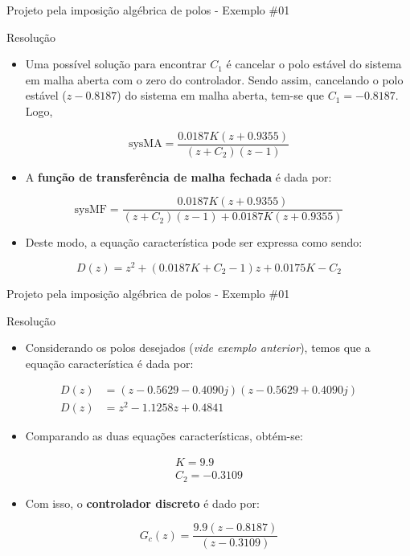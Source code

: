\begin{frame}{Projeto pela imposição algébrica de polos - Exemplo \#01}
	\begin{block}{Resolução}
\begin{itemize}
    \item Uma possível solução para encontrar $C_1$ é cancelar o polo estável do sistema em malha aberta com o zero do controlador. Sendo assim, cancelando o polo estável ($ z-\num{0,8187} $) do sistema em malha aberta, tem-se que $ C_1=-\num{0,8187} $. Logo,
\end{itemize}
	\[ \text{sysMA}=\frac{\num{0,0187}K(z+\num{0,9355})}{(z+C_2)(z-1)} \]
\begin{itemize}
\vspace{-0.2cm}
    \item A \textbf{função de transferência de malha fechada} é dada por:
\end{itemize}		
		\[ \text{sysMF}=\frac{\num{0,0187}K(z+\num{0,9355})}{(z+C_2)(z-1)+\num{0,0187}K(z+\num{0,9355})} \]
\begin{itemize}
\vspace{-0.2cm}
    \item Deste modo, a equação característica pode ser expressa como sendo:
\end{itemize}
\[  D(z)=z^{2}+(\num{0,0187}K+C_2-1)z+\num{0,0175}K-C_2 \]
	\end{block}
\end{frame}

\begin{frame}{Projeto pela imposição algébrica de polos - Exemplo \#01}
	\begin{block}{Resolução}
\begin{itemize}
    \item Considerando os polos desejados (\textit{vide exemplo anterior}), temos que a equação característica é dada por:
\end{itemize}
		\begin{align*}
			D(z)&=(z-\num{0,5629}-\num{0,4090}j)(z-\num{0,5629}+\num{0,4090}j)\\
		    D(z)&=z^{2}-\num{1,1258}z+\num{0,4841}
		\end{align*}
		\vspace{-0.3cm}
\begin{itemize}
    \item Comparando as duas equações características, obtém-se:
\end{itemize}		
		\begin{gather*}
			K=\num{9,9}\\
			C_2=-\num{0,3109}
		\end{gather*}
		\vspace{-0.3cm}
\begin{itemize}
    \item Com isso, o \textbf{controlador discreto} é dado por:
\end{itemize}
		\[ G_c(z)=\dfrac{\num{9,9}(z-\num{0,8187})}{(z-\num{0,3109})} \]
\end{block}
\end{frame}

